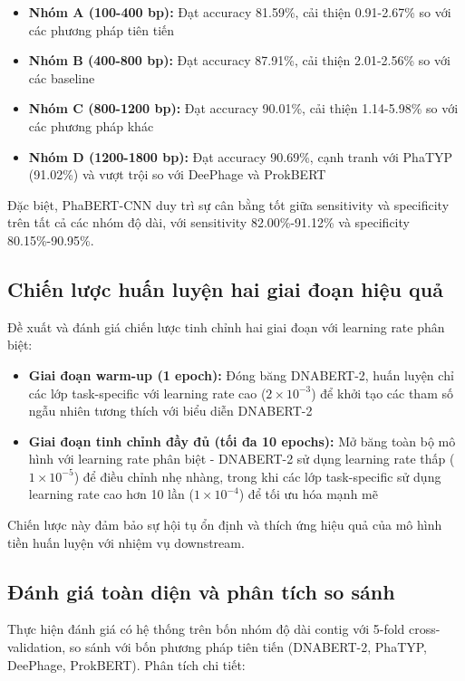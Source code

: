\begin{itemize}
    \item \textbf{Nhóm A (100-400 bp):} Đạt accuracy 81.59\%, cải thiện 0.91-2.67\% so với các phương pháp tiên tiến
    \item \textbf{Nhóm B (400-800 bp):} Đạt accuracy 87.91\%, cải thiện 2.01-2.56\% so với các baseline
    \item \textbf{Nhóm C (800-1200 bp):} Đạt accuracy 90.01\%, cải thiện 1.14-5.98\% so với các phương pháp khác
    \item \textbf{Nhóm D (1200-1800 bp):} Đạt accuracy 90.69\%, cạnh tranh với PhaTYP (91.02\%) và vượt trội so với DeePhage và ProkBERT
\end{itemize}

Đặc biệt, PhaBERT-CNN duy trì sự cân bằng tốt giữa sensitivity và specificity trên tất cả các nhóm độ dài, với sensitivity 82.00\%-91.12\% và specificity 80.15\%-90.95\%.

\subsection{Chiến lược huấn luyện hai giai đoạn hiệu quả}

Đề xuất và đánh giá chiến lược tinh chỉnh hai giai đoạn với learning rate phân biệt:

\begin{itemize}
    \item \textbf{Giai đoạn warm-up (1 epoch):} Đóng băng DNABERT-2, huấn luyện chỉ các lớp task-specific với learning rate cao ($2 \times 10^{-3}$) để khởi tạo các tham số ngẫu nhiên tương thích với biểu diễn DNABERT-2

    \item \textbf{Giai đoạn tinh chỉnh đầy đủ (tối đa 10 epochs):} Mở băng toàn bộ mô hình với learning rate phân biệt - DNABERT-2 sử dụng learning rate thấp ($1 \times 10^{-5}$) để điều chỉnh nhẹ nhàng, trong khi các lớp task-specific sử dụng learning rate cao hơn 10 lần ($1 \times 10^{-4}$) để tối ưu hóa mạnh mẽ
\end{itemize}

Chiến lược này đảm bảo sự hội tụ ổn định và thích ứng hiệu quả của mô hình tiền huấn luyện với nhiệm vụ downstream.

\subsection{Đánh giá toàn diện và phân tích so sánh}

Thực hiện đánh giá có hệ thống trên bốn nhóm độ dài contig với 5-fold cross-validation, so sánh với bốn phương pháp tiên tiến (DNABERT-2, PhaTYP, DeePhage, ProkBERT). Phân tích chi tiết:

